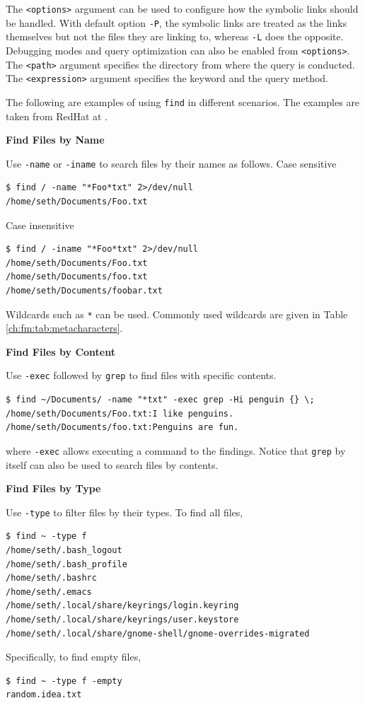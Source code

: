 The \verb|<options>| argument can be used to configure how the symbolic links should be handled. With default option \verb|-P|, the symbolic links are treated as the links themselves but not the files they are linking to, whereas \verb|-L| does the opposite. Debugging modes and query optimization can also be enabled from \verb|<options>|. The \verb|<path>| argument specifies the directory from where the query is conducted. The \verb|<expression>| argument specifies the keyword and the query method.

The following are examples of using \verb|find| in different scenarios. The examples are taken from RedHat at \cite{redhat2022find}.

\vspace{0.1in}
\noindent \textbf{Find Files by Name}
\vspace{0.1in}

Use \verb|-name| or \verb|-iname| to search files by their names as follows. Case sensitive
\begin{lstlisting}
$ find / -name "*Foo*txt" 2>/dev/null
/home/seth/Documents/Foo.txt
\end{lstlisting}
Case insensitive
\begin{lstlisting}
$ find / -iname "*Foo*txt" 2>/dev/null
/home/seth/Documents/Foo.txt
/home/seth/Documents/foo.txt
/home/seth/Documents/foobar.txt
\end{lstlisting}

Wildcards such as \verb|*| can be used. Commonly used wildcards are given in Table \ref{ch:fm:tab:metacharacters}.

\vspace{0.1in}
\noindent \textbf{Find Files by Content}
\vspace{0.1in}

Use \verb|-exec| followed by \verb|grep| to find files with specific contents.
\begin{lstlisting}
$ find ~/Documents/ -name "*txt" -exec grep -Hi penguin {} \;
/home/seth/Documents/Foo.txt:I like penguins.
/home/seth/Documents/foo.txt:Penguins are fun.
\end{lstlisting}
where \verb|-exec| allows executing a command to the findings. Notice that \verb|grep| by itself can also be used to search files by contents.

\vspace{0.1in}
\noindent \textbf{Find Files by Type}
\vspace{0.1in}

Use \verb|-type| to filter files by their types. To find all files,
\begin{lstlisting}
$ find ~ -type f
/home/seth/.bash_logout
/home/seth/.bash_profile
/home/seth/.bashrc
/home/seth/.emacs
/home/seth/.local/share/keyrings/login.keyring
/home/seth/.local/share/keyrings/user.keystore
/home/seth/.local/share/gnome-shell/gnome-overrides-migrated
\end{lstlisting}
Specifically, to find empty files,
\begin{lstlisting}
$ find ~ -type f -empty
random.idea.txt
\end{lstlisting}

